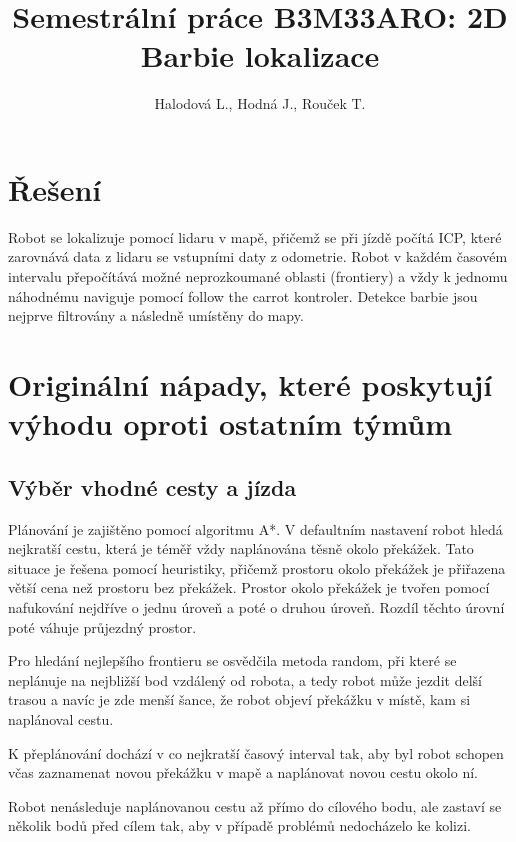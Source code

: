 \documentclass[twocolumn]{journal}
\begin{document}
\author{Halodová L., Hodná J., Rouček T.}
\title{Semestrální práce B3M33ARO: 2D Barbie lokalizace}
\maketitle

\section{Řešení}
    Robot se lokalizuje pomocí lidaru v mapě, přičemž se při jízdě počítá ICP, které zarovnává data z lidaru se vstupními daty z odometrie. Robot v každém časovém intervalu přepočítává možné neprozkoumané oblasti (frontiery) a vždy k jednomu náhodnému naviguje pomocí follow the carrot kontroler.  Detekce barbie jsou nejprve filtrovány a následně umístěny do mapy.
\section{Originální nápady, které poskytují výhodu oproti ostatním týmům}
\subsection{Výběr vhodné cesty a jízda}
    Plánování je zajištěno pomocí algoritmu A*. V defaultním nastavení robot hledá nejkratší cestu, která je téměř vždy naplánována těsně okolo překážek. Tato situace je řešena pomocí heuristiky, přičemž prostoru okolo překážek je přiřazena větší cena než prostoru bez překážek. Prostor okolo překážek je tvořen pomocí nafukování nejdříve o jednu úroveň a poté o druhou úroveň. Rozdíl těchto úrovní poté váhuje průjezdný prostor. 
    
    Pro hledání nejlepšího frontieru se osvědčila metoda random, při které se neplánuje na nejbližší bod vzdálený od robota, a tedy robot může jezdit delší trasou a navíc je zde menší šance, že robot objeví překážku v místě, kam si naplánoval cestu. 
    
    K přeplánování dochází v co nejkratší časový interval tak, aby byl robot schopen včas zaznamenat novou překážku v mapě a naplánovat novou cestu okolo ní. 
    
    Robot nenásleduje naplánovanou cestu až přímo do cílového bodu, ale zastaví se několik bodů před cílem tak, aby v případě problémů nedocházelo ke kolizi. 
    
\end{document}
